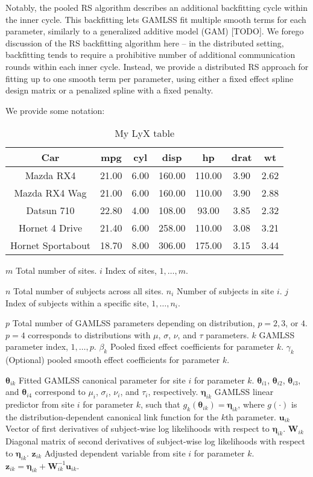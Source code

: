 \documentclass[
  12pt,
]{article}
\begin{document}
Notably, the pooled RS algorithm describes an additional backfitting cycle within the inner cycle. This backfitting lets GAMLSS fit multiple smooth terms for each parameter, similarly to a generalized additive model (GAM) {[}TODO{]}. We forego discussion of the RS backfitting algorithm here -- in the distributed setting, backfitting tends to require a prohibitive number of additional communication rounds within each inner cycle. Instead, we provide a distributed RS approach for fitting up to one smooth term per parameter, using either a fixed effect spline design matrix or a penalized spline with a fixed penalty.

We provide some notation:

\begin{table}[!h]
\centering
\caption{My LyX table}
\begin{tabular}{ccccccc}
\hline 
Car & mpg & cyl & disp & hp & drat & wt\tabularnewline
\hline 
Mazda RX4 & 21.00 & 6.00 & 160.00 & 110.00 & 3.90 & 2.62\tabularnewline
Mazda RX4 Wag & 21.00 & 6.00 & 160.00 & 110.00 & 3.90 & 2.88\tabularnewline
Datsun 710 & 22.80 & 4.00 & 108.00 & 93.00 & 3.85 & 2.32\tabularnewline
Hornet 4 Drive & 21.40 & 6.00 & 258.00 & 110.00 & 3.08 & 3.21\tabularnewline
Hornet Sportabout & 18.70 & 8.00 & 306.00 & 175.00 & 3.15 & 3.44\tabularnewline
\hline 
\end{tabular}
\label{lyxtab2}
\end{table}

\(m\) Total number of sites.
\(i\) Index of sites, \(1, \ldots, m\).

\(n\) Total number of subjects across all sites.
\(n_i\) Number of subjects in site \(i\).
\(j\) Index of subjects within a specific site, \(1, \ldots, n_i\).

\(p\) Total number of GAMLSS parameters depending on distribution, \(p = 2, 3\), or \(4\). \(p = 4\) corresponds to distributions with \(\mu\), \(\sigma\), \(\nu\), and \(\tau\) parameters.
\(k\) GAMLSS parameter index, \(1, \ldots, p\).
\(\beta_k\) Pooled fixed effect coefficients for parameter \(k\).
\(\gamma_k\) (Optional) pooled smooth effect coefficients for parameter \(k\).

\(\boldsymbol{\theta}_{ik}\) Fitted GAMLSS canonical parameter for site \(i\) for parameter \(k\). \(\boldsymbol{\theta}_{i1}\), \(\boldsymbol{\theta}_{i2}\), \(\boldsymbol{\theta}_{i3}\), and \(\boldsymbol{\theta}_{i4}\) correspond to \(\mu_i\), \(\sigma_i\), \(\nu_i\), and \(\tau_i\), respectively.
\(\boldsymbol{\eta}_{ik}\) GAMLSS linear predictor from site \(i\) for parameter \(k\), such that \(g_k(\boldsymbol{\theta}_{ik}) = \boldsymbol{\eta}_{ik}\), where \(g(\cdot)\) is the distribution-dependent canonical link function for the \(k\)th parameter.
\(\boldsymbol{u}_{ik}\) Vector of first derivatives of subject-wise log likelihoods with respect to \(\boldsymbol{\eta}_{ik}\).
\(\boldsymbol{W}_{ik}\) Diagonal matrix of second derivatives of subject-wise log likelihoods with respect to \(\boldsymbol{\eta}_{ik}\).
\(\boldsymbol{z}_{ik}\) Adjusted dependent variable from site \(i\) for parameter \(k\). \(\boldsymbol{z}_{ik} = \boldsymbol{\eta}_{ik} + \boldsymbol{W}_{ik}^{-1}\boldsymbol{u}_{ik}\).
\end{document}

